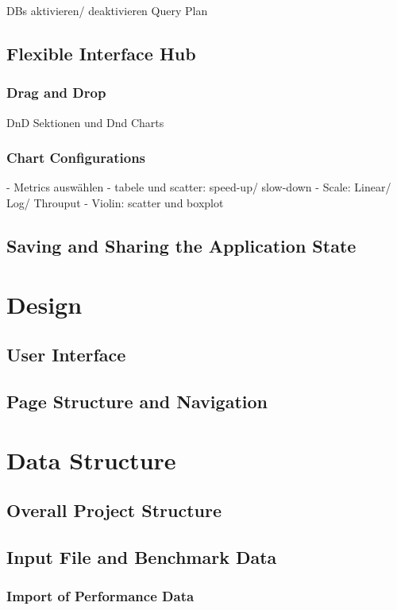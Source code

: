 DBs aktivieren/ deaktivieren
Query Plan

\subsection{Flexible Interface Hub}
\subsubsection{Drag and Drop}
DnD Sektionen und Dnd Charts
\subsubsection{Chart Configurations}
- Metrics auswählen
- tabele und scatter: speed-up/ slow-down
- Scale: Linear/ Log/ Throuput
- Violin: scatter und boxplot
\subsection{Saving and Sharing the Application State}


\section{Design}
\subsection{User Interface}
\subsection{Page Structure and Navigation}
\subsubsection{}

\section{Data Structure}
\subsection{Overall Project Structure}
\subsection{Input File and Benchmark Data}


\subsubsection{Import of Performance Data}

